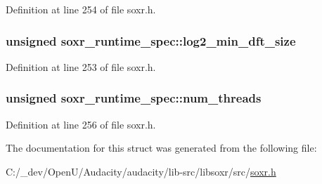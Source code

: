 Definition at line 254 of file soxr.\+h.

\subsubsection[{\texorpdfstring{log2\+\_\+min\+\_\+dft\+\_\+size}{log2_min_dft_size}}]{\setlength{\rightskip}{0pt plus 5cm}unsigned soxr\+\_\+runtime\+\_\+spec\+::log2\+\_\+min\+\_\+dft\+\_\+size}\hypertarget{structsoxr__runtime__spec_a6e1d0c0e5099f2f575d5029a0aae121d}{}\label{structsoxr__runtime__spec_a6e1d0c0e5099f2f575d5029a0aae121d}


Definition at line 253 of file soxr.\+h.

\subsubsection[{\texorpdfstring{num\+\_\+threads}{num_threads}}]{\setlength{\rightskip}{0pt plus 5cm}unsigned soxr\+\_\+runtime\+\_\+spec\+::num\+\_\+threads}\hypertarget{structsoxr__runtime__spec_a2347bb798d0890828e2f03d165e80dd1}{}\label{structsoxr__runtime__spec_a2347bb798d0890828e2f03d165e80dd1}


Definition at line 256 of file soxr.\+h.



The documentation for this struct was generated from the following file\+:\begin{DoxyCompactItemize}
\item 
C\+:/\+\_\+dev/\+Open\+U/\+Audacity/audacity/lib-\/src/libsoxr/src/\hyperlink{soxr_8h}{soxr.\+h}\end{DoxyCompactItemize}
